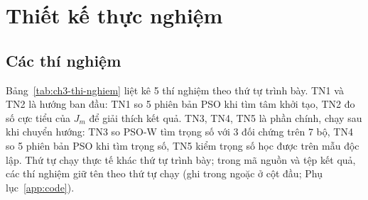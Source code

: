 \section{Thiết kế thực nghiệm}
\label{sec:thiet-lap}

\subsection{Các thí nghiệm}
\label{sec:cac-thi-nghiem}

Bảng~\ref{tab:ch3-thi-nghiem} liệt kê 5 thí nghiệm theo thứ tự trình bày. TN1 và TN2 là hướng ban đầu: TN1 so 5 phiên bản PSO
khi tìm tâm khởi tạo, TN2 đo số cực tiểu của $J_m$ để giải thích kết quả. TN3, TN4, TN5 là phần chính, chạy sau khi chuyển hướng: TN3 so PSO-W tìm trọng số với 3 đối
chứng trên 7 bộ, TN4 so 5 phiên bản PSO khi tìm trọng số, TN5 kiểm trọng số học được trên mẫu độc lập. Thứ tự chạy thực tế
khác thứ tự trình bày; trong mã nguồn và tệp kết quả, các thí nghiệm giữ tên theo thứ tự chạy (ghi trong ngoặc ở cột đầu;
Phụ lục~\ref{app:code}).

